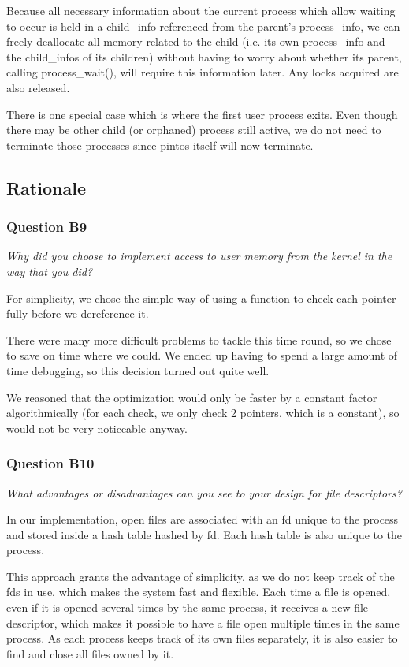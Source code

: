 Because all necessary information about the current process which allow waiting to occur is held in a child\_info referenced from the parent's process\_info, we can freely deallocate all memory related to the child (i.e. its own process\_info and the child\_infos of its children) without having to worry about whether its parent, calling process\_wait(), will require this information later. Any locks acquired are also released.

There is one special case which is where the first user process exits. Even though there may be other child (or orphaned) process still active, we do not need to terminate those processes since pintos itself will now terminate.

\subsection{Rationale}

\subsubsection*{Question B9} %
\textit{Why did you choose to implement access to user memory from the kernel in the way that you did?}

For simplicity, we chose the simple way of using a function to check each
pointer fully before we dereference it.

There were many more difficult problems to tackle this time round, so we chose
to save on time where we could. We ended up having to spend a large amount of
time debugging, so this decision turned out quite well.

We reasoned that the optimization would only be faster by a constant factor
algorithmically (for each check, we only check 2 pointers, which is a constant),
so would not be very noticeable anyway.

\subsubsection*{Question B10} %
\textit{What advantages or disadvantages can you see to your design for file descriptors?}

In our implementation, open files are associated with an fd unique to the process and stored inside a hash table hashed by fd. Each hash table is also unique to the process.

This approach grants the advantage of simplicity, as we do not keep track of the fds in use, which makes the system fast and flexible.
Each time a file is opened, even if it is opened several times by the same process, it receives a new file descriptor, which makes it possible to have a file open multiple times in the same process.
As each process keeps track of its own files separately, it is also easier to find and close all files owned by it.


